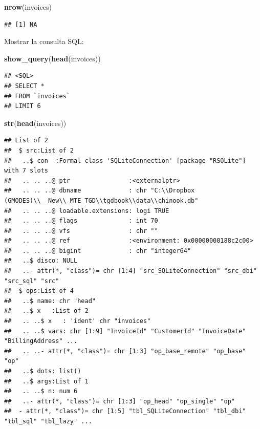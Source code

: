 \documentclass[]{book}
\newenvironment{Shaded}{\begin{snugshade}}{\end{snugshade}}
\newcommand{\KeywordTok}[1]{\textcolor[rgb]{0.13,0.29,0.53}{\textbf{#1}}}
\newcommand{\NormalTok}[1]{#1}
\begin{document}
\begin{Shaded}
\begin{Highlighting}[]
\KeywordTok{nrow}\NormalTok{(invoices)}
\end{Highlighting}
\end{Shaded}

\begin{verbatim}
## [1] NA
\end{verbatim}

Mostrar la consulta SQL:

\begin{Shaded}
\begin{Highlighting}[]
\KeywordTok{show_query}\NormalTok{(}\KeywordTok{head}\NormalTok{(invoices))}
\end{Highlighting}
\end{Shaded}

\begin{verbatim}
## <SQL>
## SELECT *
## FROM `invoices`
## LIMIT 6
\end{verbatim}

\begin{Shaded}
\begin{Highlighting}[]
\KeywordTok{str}\NormalTok{(}\KeywordTok{head}\NormalTok{(invoices))}
\end{Highlighting}
\end{Shaded}

\begin{verbatim}
## List of 2
##  $ src:List of 2
##   ..$ con  :Formal class 'SQLiteConnection' [package "RSQLite"] with 7 slots
##   .. .. ..@ ptr                :<externalptr> 
##   .. .. ..@ dbname             : chr "C:\\Dropbox (GMODES)\\__New\\_MTE_TGD\\tgdbook\\data\\chinook.db"
##   .. .. ..@ loadable.extensions: logi TRUE
##   .. .. ..@ flags              : int 70
##   .. .. ..@ vfs                : chr ""
##   .. .. ..@ ref                :<environment: 0x00000000188c2c00> 
##   .. .. ..@ bigint             : chr "integer64"
##   ..$ disco: NULL
##   ..- attr(*, "class")= chr [1:4] "src_SQLiteConnection" "src_dbi" "src_sql" "src"
##  $ ops:List of 4
##   ..$ name: chr "head"
##   ..$ x   :List of 2
##   .. ..$ x   : 'ident' chr "invoices"
##   .. ..$ vars: chr [1:9] "InvoiceId" "CustomerId" "InvoiceDate" "BillingAddress" ...
##   .. ..- attr(*, "class")= chr [1:3] "op_base_remote" "op_base" "op"
##   ..$ dots: list()
##   ..$ args:List of 1
##   .. ..$ n: num 6
##   ..- attr(*, "class")= chr [1:3] "op_head" "op_single" "op"
##  - attr(*, "class")= chr [1:5] "tbl_SQLiteConnection" "tbl_dbi" "tbl_sql" "tbl_lazy" ...
\end{verbatim}
\end{document}
